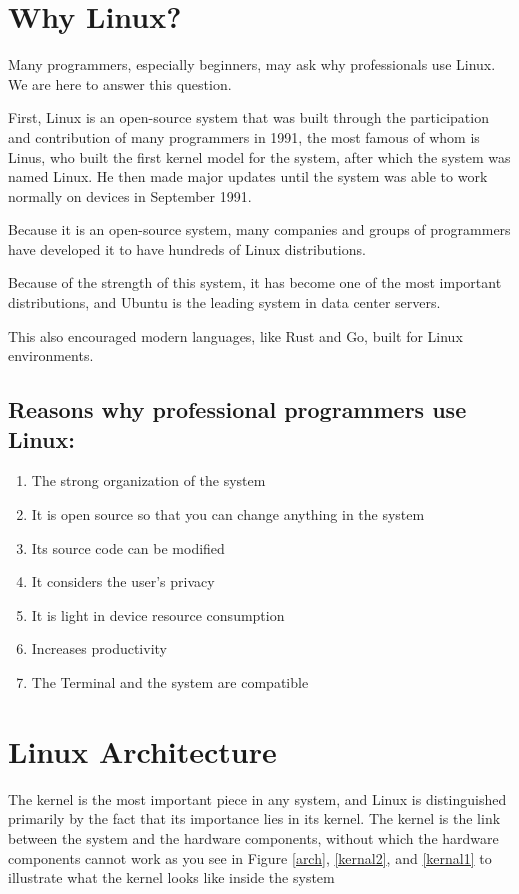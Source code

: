 \documentclass[12pt, a4paper]{article}
\begin{document}
\newpage


\section{Why Linux?}

Many programmers, especially beginners, may ask why professionals use Linux.
We are here to answer this question.

First, Linux is an open-source system that was built through the participation and
contribution of many programmers in 1991, the most famous of whom is Linus, who
built the first kernel model for the system, after which the system was named Linux.
He then made major updates until the system was able to work normally on devices
in September 1991.

Because it is an open-source system, many companies and groups of programmers have
developed it to have hundreds of Linux distributions.

Because of the strength of this system, it has become one of the most important
distributions, and Ubuntu is the leading system in data center servers.

This also encouraged modern languages, like Rust and Go, built for Linux environments. 

\subsection{Reasons why professional programmers use Linux:}

\begin{enumerate}[leftmargin=2em, itemsep=0.3em]
  \item The strong organization of the system
  \item It is open source so that you can change anything in the system
  \item Its source code can be modified
  \item It considers the user's privacy
  \item It is light in device resource consumption
  \item Increases productivity
  \item The Terminal and the system are compatible
\end{enumerate}


\newpage


\section{Linux Architecture}
The kernel is the most important piece in any system, and Linux is distinguished primarily by the fact that its importance lies in its kernel.
The kernel is the link between the system and the hardware components, without which the hardware components cannot work
as you see in Figure \ref{arch}, \ref{kernal2}, and \ref{kernal1}  to illustrate what the kernel looks like inside the system
\end{document}
